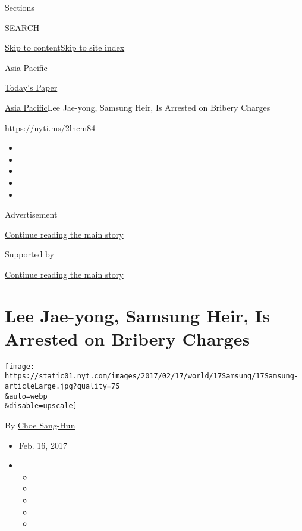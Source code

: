 Sections

SEARCH

\protect\hyperlink{site-content}{Skip to
content}\protect\hyperlink{site-index}{Skip to site index}

\href{https://www.nytimes.com/section/world/asia}{Asia Pacific}

\href{https://myaccount.nytimes.com/auth/login?response_type=cookie\&client_id=vi}{}

\href{https://www.nytimes.com/section/todayspaper}{Today's Paper}

\href{/section/world/asia}{Asia Pacific}\textbar{}Lee Jae-yong, Samsung
Heir, Is Arrested on Bribery Charges

\url{https://nyti.ms/2lncm84}

\begin{itemize}
\item
\item
\item
\item
\item
\end{itemize}

Advertisement

\protect\hyperlink{after-top}{Continue reading the main story}

Supported by

\protect\hyperlink{after-sponsor}{Continue reading the main story}

\hypertarget{lee-jae-yong-samsung-heir-is-arrested-on-bribery-charges}{%
\section{Lee Jae-yong, Samsung Heir, Is Arrested on Bribery
Charges}\label{lee-jae-yong-samsung-heir-is-arrested-on-bribery-charges}}

\texttt{[image: https://static01.nyt.com/images/2017/02/17/world/17Samsung/17Samsung-articleLarge.jpg?quality=75\\\&auto=webp\\\&disable=upscale]}

By \href{http://www.nytimes.com/by/choe-sang-hun}{Choe Sang-Hun}

\begin{itemize}
\item
  Feb. 16, 2017
\item
  \begin{itemize}
  \item
  \item
  \item
  \item
  \item
  \end{itemize}
\end{itemize}

